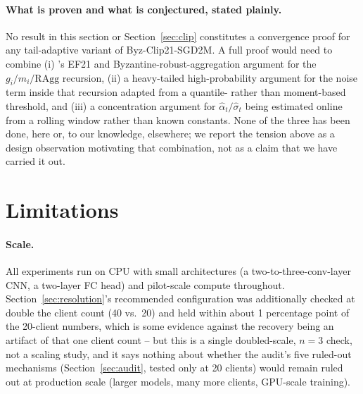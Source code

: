 \documentclass{article}
\begin{document}
\paragraph{What is proven and what is conjectured, stated plainly.} No result in
this section or Section~\ref{sec:clip} constitutes a convergence proof for any
tail-adaptive variant of Byz-Clip21-SGD2M. A full proof would need to combine (i)
\citeauthor{islamov2026byzclip}'s EF21 and Byzantine-robust-aggregation argument
for the $g_i/m_i/\mathrm{RAgg}$ recursion, (ii) a heavy-tailed high-probability
argument for the noise term inside that recursion adapted from a quantile-
rather than moment-based threshold, and (iii) a concentration argument for
$\hat\alpha_t/\hat\sigma_t$ being estimated online from a rolling window rather
than known constants. None of the three has been done, here or, to our
knowledge, elsewhere; we report the tension above as a design observation
motivating that combination, not as a claim that we have carried it out.

\section{Limitations}
\label{sec:limitations}

\paragraph{Scale.} All experiments run on CPU with small architectures (a
two-to-three-conv-layer CNN, a two-layer FC head) and pilot-scale compute
throughout. Section~\ref{sec:resolution}'s recommended configuration was
additionally checked at double the client count (40 vs.\ 20) and held within
about 1 percentage point of the 20-client numbers, which is some evidence
against the recovery being an artifact of that one client count -- but this is
a single doubled-scale, $n{=}3$ check, not a scaling study, and it says
nothing about whether the audit's five ruled-out mechanisms (Section~\ref{sec:audit},
tested only at 20 clients) would remain ruled out at production scale (larger
models, many more clients, GPU-scale training).
\end{document}
